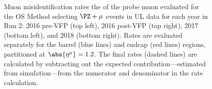 \begin{figure}[!htbp]
\begin{center}
		\caption{
			Muon misidentification rates \vs the \pt of the probe muon evaluated for the OS Method selecting $\PZ + \mu$ events in UL data
			for each year in Run 2:
			2016 pre-VFP (top left),
			2016 post-VFP (top right),
			2017 (bottom left), and
			2018 (bottom right).
			Rates are evaluated separately for the barrel (blue lines) and endcap (red lines) regions,
			partitioned at $\abs{\eta^{\mu}} = 1.2$.
			The final rates (dashed lines) are calculated by subtracting out the expected \WZ contribution---estimated from simulation---from the numerator and denominator in the rate calculation.
		}
		\label{fr_plots_mu}
	\end{center}
\end{figure}
